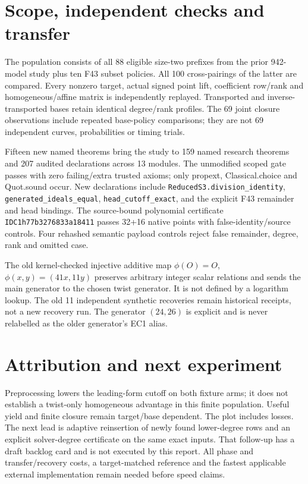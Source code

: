 \documentclass[10pt]{article}
\begin{document}
\newpage
\section*{Scope, independent checks and transfer}
The population consists of all 88 eligible size-two prefixes from the
prior 942-model study plus ten F43 subset policies. All 100 cross-pairings of
the latter are compared. Every nonzero target, actual signed point lift,
coefficient row/rank and homogeneous/affine matrix is independently replayed.
Transported and inverse-transported bases retain identical degree/rank profiles.
The 69 joint closure observations include repeated base-policy comparisons;
they are not 69 independent curves, probabilities or timing trials.

Fifteen new named theorems bring the study to 159 named research theorems and
207 audited declarations across 13 modules. The unmodified scoped gate passes
with zero failing/extra trusted axioms; only propext, Classical.choice and
Quot.sound occur. New declarations include
\texttt{ReducedS3.division\_identity},
\texttt{generated\_ideals\_equal},
\texttt{head\_cutoff\_exact}, and the explicit F43 remainder and head bindings.
The source-bound polynomial certificate \texttt{IDC1h77b3276833a18411}
passes 32+16 native points with false-identity/source controls. Four rehashed
semantic payload controls reject false remainder, degree, rank and omitted case.

The old kernel-checked injective additive map
$\phi(O)=O$, $\phi(x,y)=(41x,11y)$ preserves arbitrary integer scalar relations
and sends the main generator to the chosen twist generator. It is not
defined by a logarithm lookup. The old 11 independent synthetic recoveries
remain historical receipts, not a new recovery run. The generator $(24,26)$
is explicit and is never relabelled as the older generator's EC1 alias.

\section*{Attribution and next experiment}
Preprocessing lowers the leading-form cutoff on both fixture arms; it does
not establish a twist-only homogeneous advantage in this finite population.
Useful yield and finite closure remain target/base dependent. The plot includes
losses. The next lead is adaptive reinsertion of newly found lower-degree rows
and an explicit solver-degree certificate on the same exact inputs. That
follow-up has a draft backlog card and is not executed by this report.
All phase and transfer/recovery costs, a target-matched reference and the
fastest applicable external implementation remain needed before speed claims.
\end{document}
